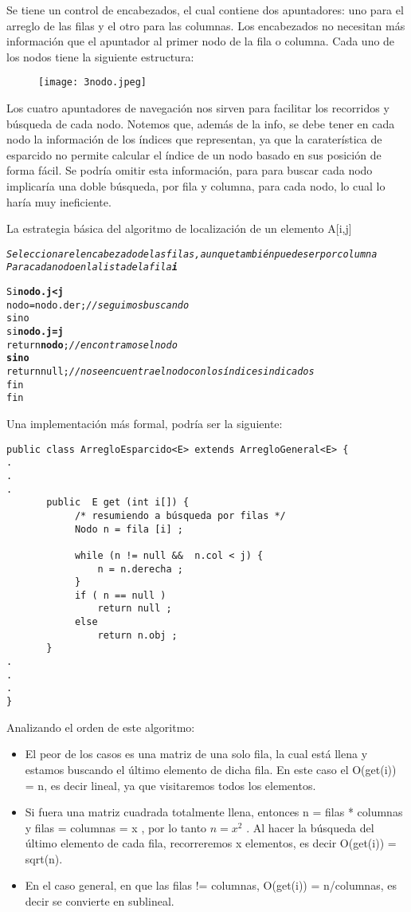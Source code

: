 Se tiene un control de encabezados, el cual contiene dos apuntadores:
uno para el arreglo de las filas y el otro para las columnas.  Los
encabezados no necesitan más información que el apuntador al primer
nodo de la fila o columna.  Cada uno de los nodos tiene la siguiente
estructura:
\begin{figure}[H]
  \centering
  \texttt{[image: 3nodo.jpeg]}
\end{figure}

Los cuatro apuntadores de navegación nos sirven para facilitar los
recorridos y búsqueda de cada nodo.  Notemos que, además de la info,
se debe tener en cada nodo la información de los índices que
representan, ya que la caraterística de esparcido no permite calcular
el índice de un nodo basado en sus posición de forma fácil.  Se podría
omitir esta información, para para buscar cada nodo implicaría una
doble búsqueda, por fila y columna, para cada nodo, lo cual lo haría
muy ineficiente.

La estrategia básica del algoritmo de localización de un elemento
A[i,j]

\begin{alltt}
   {\it Seleccionar el encabezado de las filas, aunque también puede ser por columna
   Para cada nodo en la lista de la fila {\bf i}}
  
   Si {\bf nodo.j < j}
        nodo = nodo.der  ; {\it //seguimos buscando}
   sino
        si {\bf nodo.j=j}
             return {\bf nodo} ; {\it // encontramos el nodo}
        {\bf sino}
             return null ;  {\it // no se encuentra el nodo con los índices indicados}
        fin
   fin 
\end{alltt}

Una implementación más formal, podría ser la siguiente:

\begin{verbatim}
public class ArregloEsparcido<E> extends ArregloGeneral<E> {
.
.
.
       public  E get (int i[]) {
            /* resumiendo a búsqueda por filas */
            Nodo n = fila [i] ;

            while (n != null &&  n.col < j) {
                n = n.derecha ;
            }
            if ( n == null )
                return null ;
            else
                return n.obj ;
       }
.
.
.
}
\end{verbatim}

Analizando el orden de este algoritmo:
\begin{itemize}
\item El peor de los casos es una matriz de una solo fila, la cual está
llena y estamos buscando el último elemento de dicha fila.  En este
caso el O(get(i)) = n, es decir lineal, ya que visitaremos todos los
elementos.
\item Si fuera una matriz cuadrada totalmente llena, entonces n = filas *
columnas y filas = columnas = x , por lo tanto $n = x^2$ .  Al hacer la
búsqueda del último elemento de cada fila, recorreremos x elementos,
es decir O(get(i)) = sqrt(n).
\item En el caso general, en que las filas != columnas, O(get(i)) =
  n/columnas, es decir se convierte en sublineal.
\end{itemize}

